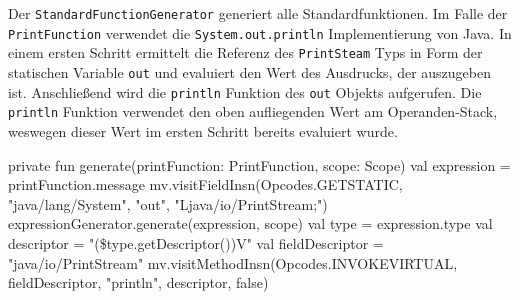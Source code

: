 Der \texttt{StandardFunctionGenerator} generiert alle Standardfunktionen. Im Falle der \texttt{PrintFunction} verwendet \toya die \texttt{System.out.println} Implementierung von Java. In einem ersten Schritt ermittelt \toya die Referenz des \texttt{PrintSteam} Typs in Form der statischen Variable \texttt{out} und evaluiert \toya den Wert des Ausdrucks, der auszugeben ist. Anschließend wird die \texttt{println} Funktion des \texttt{out} Objekts aufgerufen. Die \texttt{println} Funktion verwendet den oben aufliegenden Wert am Operanden-Stack, weswegen dieser Wert im ersten Schritt bereits evaluiert wurde.

\begin{KotlinCode}[numbers=none, caption={Bytecode zum Aufruf der \texttt{println} Funktion von Java}]
private fun generate(printFunction: PrintFunction, scope: Scope) {
    val expression = printFunction.message
    mv.visitFieldInsn(Opcodes.GETSTATIC, "java/lang/System", "out", "Ljava/io/PrintStream;")
    expressionGenerator.generate(expression, scope)
    val type = expression.type
    val descriptor = "(\${type.getDescriptor()})V"
    val fieldDescriptor = "java/io/PrintStream"
    mv.visitMethodInsn(Opcodes.INVOKEVIRTUAL, fieldDescriptor, "println", descriptor, false)
}
\end{KotlinCode}